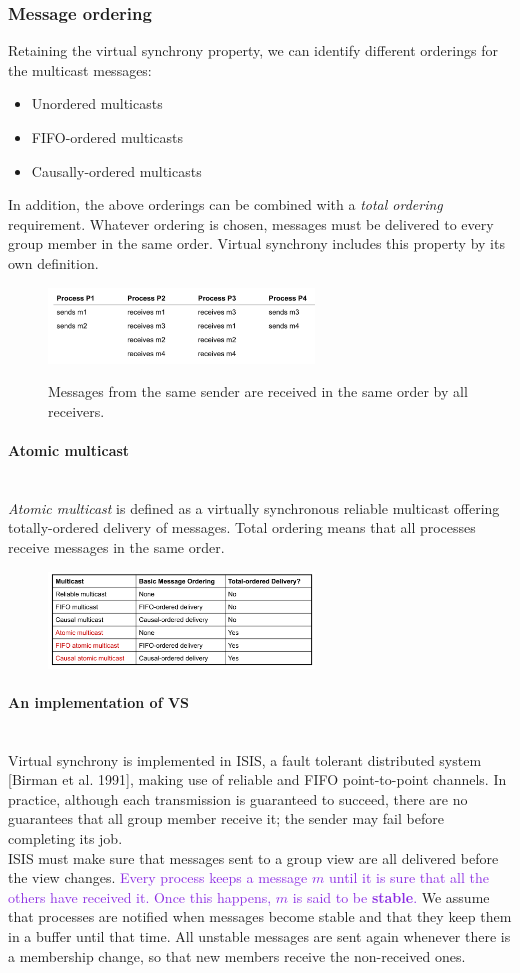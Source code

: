 \documentclass[10pt,a4paper]{article}
\newcommand{\myparagraph}[1]{\paragraph{#1}\mbox{}\\[0.05in]}
\begin{document}
\subsubsection{Message ordering}
Retaining the virtual synchrony property, we can identify different orderings for the multicast messages:
\begin{itemize}
	\item Unordered multicasts
	\item FIFO-ordered multicasts
	\item Causally-ordered multicasts
\end{itemize}
In addition, the above orderings can be combined with a \textit{total ordering} requirement. Whatever ordering is chosen, messages must be delivered to every group member in the same order. Virtual synchrony includes this property by its own definition. 
\begin{figure}[h!]
\hfill \includegraphics[width=200pt]{images/msg-ordering.png}\hspace*{\fill}
  \label{fig:msg-ordering}
  \caption{Messages from the same sender are received in the same order by all receivers.}
\end{figure}
\myparagraph{Atomic multicast}
\textit{Atomic multicast} is defined as a virtually synchronous reliable multicast offering totally-ordered delivery of messages. Total ordering means that all processes receive messages in the same order.
\begin{figure}[h!]
\hfill \includegraphics[width=200pt]{images/atomic-multicast.png}\hspace*{\fill}
  \label{fig:atomic-multicast}
\end{figure}
\myparagraph{An implementation of VS}
Virtual synchrony is implemented in ISIS, a fault tolerant distributed system [Birman et al. 1991], making use of reliable and FIFO point-to-point channels. In practice, although each transmission is guaranteed to succeed, there are no guarantees that all group member receive it; the sender may fail before completing its job. \\ ISIS must make sure that messages sent to a group view are all delivered before the view changes. \textcolor{BlueViolet}{Every process keeps a message $m$ until it is sure that all the others have received it. Once this happens, $m$ is said to be \textbf{stable}.} We assume that processes are notified when messages become stable and that they keep them in a buffer until that time. All unstable messages are sent again whenever there is a membership change, so that new members receive the non-received ones. \\ \\
\end{document}
